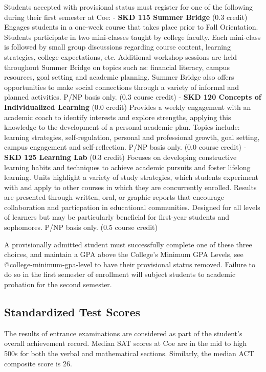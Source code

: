 \documentclass[
  letterpaper,
]{scrbook}
\begin{document}
Students accepted with provisional status must register for one of the
following during their first semester at Coe: - \textbf{SKD 115 Summer
Bridge} (0.3 credit) Engages students in a one-week course that takes
place prior to Fall Orientation. Students participate in two
mini-classes taught by college faculty. Each mini-class is followed by
small group discussions regarding course content, learning strategies,
college expectations, etc. Additional workshop sessions are held
throughout Summer Bridge on topics such as: financial literacy, campus
resources, goal setting and academic planning. Summer Bridge also offers
opportunities to make social connections through a variety of informal
and planned activities. P/NP basis only. (0.3 course credit) -
\textbf{SKD 120 Concepts of Individualized Learning} (0.0 credit)
Provides a weekly engagement with an academic coach to identify
interests and explore strengths, applying this knowledge to the
development of a personal academic plan. Topics include: learning
strategies, self-regulation, personal and professional growth, goal
setting, campus engagement and self-reflection. P/NP basis only. (0.0
course credit) - \textbf{SKD 125 Learning Lab} (0.3 credit) Focuses on
developing constructive learning habits and techniques to achieve
academic pursuits and foster lifelong learning. Units highlight a
variety of study strategies, which students experiment with and apply to
other courses in which they are concurrently enrolled. Results are
presented through written, oral, or graphic reports that encourage
collaboration and particpation in educational communities. Designed for
all levels of learners but may be particularly beneficial for first-year
students and sophomores. P/NP basis only. (0.5 course credit)

A provisionally admitted student must successfully complete one of these
three choices, and maintain a GPA above the College's Minimum GPA
Levels, see @college-minimum-gpa-level to have their provisional status
removed. Failure to do so in the first semester of enrollment will
subject students to academic probation for the second semester.

\subsection{Standardized Test Scores}\label{standardized-test-scores}

The results of entrance examinations are considered as part of the
student's overall achievement record. Median SAT scores at Coe are in
the mid to high 500s for both the verbal and mathematical sections.
Similarly, the median ACT composite score is 26.
\end{document}
